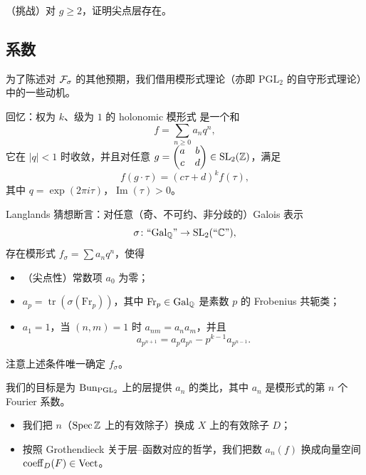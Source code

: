 \begin{exercise}\label{ex:cusp-exist}
（挑战）对 \(g\ge 2\)，证明尖点层存在。
\end{exercise}

\subsection{系数}

为了陈述对 \(\mathcal{F}_\sigma\) 的其他预期，我们借用模形式理论（亦即 \(\mathrm{PGL}_2\) 的自守形式理论）中的一些动机。

回忆：权为 \(k\)、级为 \(1\) 的 holonomic 模形式
是一个和
\[
f=\sum_{n\ge 0}a_n q^n,
\]
它在 \(|q|<1\) 时收敛，并且对任意 \(g=\begin{pmatrix}a&b\\c&d\end{pmatrix}\in\mathrm{SL}_2(\mathbb{Z})\)，满足
\[
f(g\cdot\tau)=(c\tau+d)^k f(\tau),
\]
其中 \(q=\exp(2\pi i\tau)\)，\(\operatorname{Im}(\tau)>0\)。

Langlands 猜想断言：对任意（奇、不可约、非分歧的）Galois 表示
\[
\sigma\colon\text{``}\mathrm{Gal}_{\mathbb{Q}}\text{''}\to\mathrm{SL}_2(\text{``}\mathbb{C}\text{''}),
\]
存在模形式 \(f_\sigma=\sum a_n q^n\)，使得

\begin{itemize}
\item （尖点性）常数项 \(a_0\) 为零；
\item \(a_p=\operatorname{tr}(\sigma(\mathrm{Fr}_p))\)，其中 \(\mathrm{Fr}_p\in\mathrm{Gal}_{\mathbb{Q}}\) 是素数 \(p\) 的 Frobenius 共轭类；
\item \(a_1=1\)，当 \((n,m)=1\) 时 \(a_{nm}=a_n a_m\)，并且
\begin{equation}\label{eq:2.1}
a_{p^{n+1}}=a_p a_{p^n}-p^{k-1}a_{p^{n-1}}.
\end{equation}
\end{itemize}

注意上述条件唯一确定 \(f_\sigma\)。

我们的目标是为 \(\operatorname{Bun}_{\mathrm{PGL}_2}\) 上的层提供 \(a_n\) 的类比，其中 \(a_n\) 是模形式的第 \(n\) 个 Fourier 系数。

\begin{itemize}
\item 我们把 \(n\)（\(\operatorname{Spec}\mathbb{Z}\) 上的有效除子）换成 \(X\) 上的有效除子 \(D\)；
\item 按照 Grothendieck 关于层--函数对应的哲学，我们把数 \(a_n(f)\) 换成向量空间 \(\operatorname{coeff}_D(F)\in\mathrm{Vect}\)。
\end{itemize}

